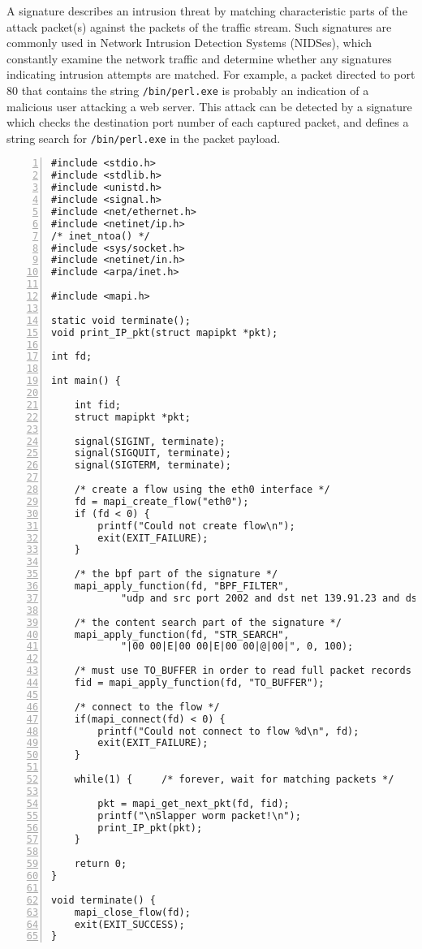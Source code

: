 \documentclass[a4paper, 11pt]{article}
\begin{document}
A signature describes an intrusion threat by matching characteristic
parts of the attack packet(s) against the packets of the traffic stream.
Such signatures are commonly used in
Network Intrusion Detection Systems (NIDSes), which constantly examine
the network traffic and determine whether any signatures indicating intrusion
attempts are matched.
For example, a packet directed to port 80 that contains the string
{\tt /bin/perl.exe} is probably an indication of a malicious user attacking a
web server. This attack can be detected by a signature which checks the
destination port number of each captured packet,
and defines a string search for {\tt /bin/perl.exe} in the packet payload.

\begin{Verbatim}[numbersep=12pt, numbers=left, baselinestretch=1.0, fontsize=\small]
#include <stdio.h>
#include <stdlib.h>
#include <unistd.h>
#include <signal.h>
#include <net/ethernet.h>
#include <netinet/ip.h>
/* inet_ntoa() */
#include <sys/socket.h>
#include <netinet/in.h>
#include <arpa/inet.h>

#include <mapi.h>

static void terminate();
void print_IP_pkt(struct mapipkt *pkt);

int fd;

int main() {

    int fid;
    struct mapipkt *pkt;
    
    signal(SIGINT, terminate);
    signal(SIGQUIT, terminate);
    signal(SIGTERM, terminate);

    /* create a flow using the eth0 interface */
    fd = mapi_create_flow("eth0");
    if (fd < 0) {
        printf("Could not create flow\n");
        exit(EXIT_FAILURE);
    }

    /* the bpf part of the signature */
    mapi_apply_function(fd, "BPF_FILTER",
            "udp and src port 2002 and dst net 139.91.23 and dst port 80");
    
    /* the content search part of the signature */
    mapi_apply_function(fd, "STR_SEARCH",
            "|00 00|E|00 00|E|00 00|@|00|", 0, 100);

    /* must use TO_BUFFER in order to read full packet records */
    fid = mapi_apply_function(fd, "TO_BUFFER");

    /* connect to the flow */
    if(mapi_connect(fd) < 0) {
        printf("Could not connect to flow %d\n", fd);
        exit(EXIT_FAILURE);
    }
    
    while(1) {     /* forever, wait for matching packets */
        
        pkt = mapi_get_next_pkt(fd, fid);
        printf("\nSlapper worm packet!\n");
        print_IP_pkt(pkt);
    }
    
    return 0;
}

void terminate() {
    mapi_close_flow(fd);
    exit(EXIT_SUCCESS);
}
\end{Verbatim}
\end{document}
